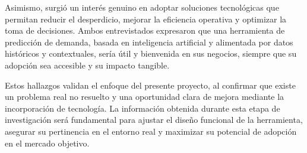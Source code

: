 \indent Asimismo, surgió un interés genuino en adoptar soluciones tecnológicas que permitan reducir el desperdicio, mejorar la eficiencia operativa y optimizar la toma de decisiones. Ambos entrevistados expresaron que una herramienta de predicción de demanda, basada en inteligencia artificial y alimentada por datos históricos y contextuales, sería útil y bienvenida en sus negocios, siempre que su adopción sea accesible y su impacto tangible.

\indent Estos hallazgos validan el enfoque del presente proyecto, al confirmar que existe un problema real no resuelto y una oportunidad clara de mejora mediante la incorporación de tecnología. La información obtenida durante esta etapa de investigación será fundamental para ajustar el diseño funcional de la herramienta, asegurar su pertinencia en el entorno real y maximizar su potencial de adopción en el mercado objetivo.

